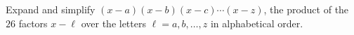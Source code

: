 Expand and simplify $(x-a)(x-b)(x-c)\cdots(x-z)$, the product of the $26$ factors $x-\ell$ over the letters $\ell=a,b,\dots,z$ in alphabetical order.
